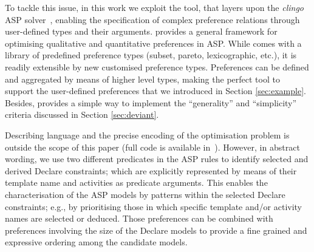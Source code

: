 To tackle this issue, in this work we exploit the \asprin tool\cite{DBLP:conf/aaai/BrewkaD0S15}, that layers upon the \emph{clingo} \ac{ASP} solver~\cite{clingo}, enabling the specification of complex preference relations through user-defined  types and their arguments. 
%
%
\asprin provides a general framework for optimising qualitative and quantitative preferences in \ac{ASP}. %
While \asprin comes with a library of predefined preference types (subset, pareto, lexicographic, etc.), it is readily extensible by new customised preference types. Preferences can be defined and aggregated by means of higher level types, making \asprin the perfect tool to support the user-defined preferences that we introduced in Section \ref{sec:example}. Besides, \asprin provides a simple way to implement the ``generality'' and ``simplicity'' criteria discussed in Section \ref{sec:deviant}.



Describing \asprin language and the precise encoding of the optimisation problem is outside the scope of this paper (full code is available in~\cite{zenodo:experiments}). However, in abstract wording, we use two different predicates in the \ac{ASP} rules to identify selected and derived Declare constraints; which are explicitly represented by means of their template name and activities as predicate arguments.
%
This enables the characterisation of the \ac{ASP} models by patterns within the selected Declare constraints; e.g., by prioritising those in which specific template and/or activity names are selected or deduced. Those preferences can be combined with preferences involving the size of the Declare models to provide a fine grained and expressive ordering among the candidate models.
